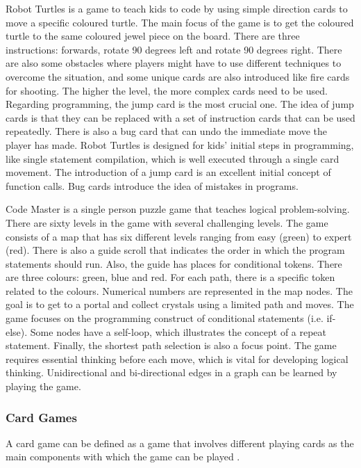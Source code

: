 Robot Turtles \cite{RobotTurtles} is a game to teach kids to code by using simple direction cards to move a specific coloured turtle. The main focus of the game is to get the coloured turtle to the same coloured jewel piece on the board. There are three instructions: forwards, rotate 90 degrees left and rotate 90 degrees right. There are also some obstacles where players might have to use different techniques to overcome the situation, and some unique cards are also introduced like fire cards for shooting. The higher the level, the more complex cards need to be used.
Regarding programming, the jump card is the most crucial one. The idea of jump cards is that they can be replaced with a set of instruction cards that can be used repeatedly. There is also a bug card that can undo the immediate move the player has made. Robot Turtles is designed for kids’ initial steps in programming, like single statement compilation, which is well executed through a single card movement. The introduction of a jump card is an excellent initial concept of function calls. Bug cards introduce the idea of mistakes in programs.

Code Master \cite{CodeMaster} is a single person puzzle game that teaches logical problem-solving. There are sixty levels in the game with several challenging levels. The game consists of a map that has six different levels ranging from easy (green) to expert (red). There is also a guide scroll that indicates the order in which the program statements should run. Also, the guide has places for conditional tokens. There are three colours: green, blue and red. For each path, there is a specific token related to the colours. Numerical numbers are represented in the map nodes. The goal is to get to a portal and collect crystals using a limited path and moves. The game focuses on the programming construct of conditional statements (i.e. if-else). Some nodes have a self-loop, which illustrates the concept of a repeat statement. Finally, the shortest path selection is also a focus point. The game requires essential thinking before each move, which is vital for developing logical thinking. Unidirectional and bi-directional edges in a graph can be learned by playing the game. 

\subsubsection{Card Games}

A card game can be defined as a game that involves different playing cards as the main components with which the game can be played \cite{cardgames}.

